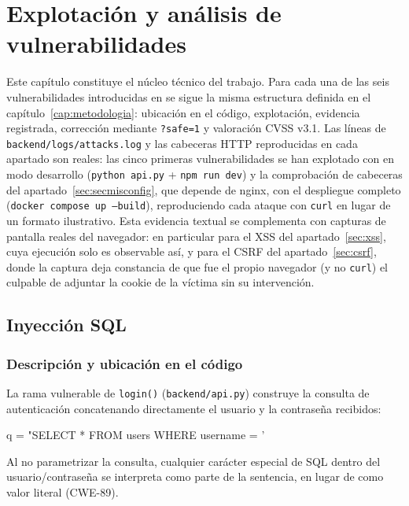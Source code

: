 \chapter{Explotación y análisis de vulnerabilidades}
\label{cap:explotacion}

Este capítulo constituye el núcleo técnico del trabajo. Para cada una de las
seis vulnerabilidades introducidas en \breachlab se sigue la misma
estructura definida en el capítulo~\ref{cap:metodologia}: ubicación en el
código, explotación,
evidencia registrada, corrección mediante \texttt{?safe=1} y valoración
CVSS v3.1. Las líneas de \texttt{backend/logs/attacks.log} y las cabeceras
HTTP reproducidas en cada apartado son reales: las cinco primeras
vulnerabilidades se han explotado con \breachlab en modo desarrollo
(\texttt{python api.py} + \texttt{npm run dev}) y la comprobación de
cabeceras del apartado~\ref{sec:secmisconfig}, que depende de nginx, con el
despliegue completo (\texttt{docker compose up --build}), reproduciendo cada
ataque con \texttt{curl} en lugar de un formato ilustrativo. Esta evidencia
textual se complementa con capturas de pantalla reales del navegador: en particular para
el XSS del apartado~\ref{sec:xss}, cuya ejecución solo es observable así, y
para el CSRF del apartado~\ref{sec:csrf}, donde la captura deja constancia
de que fue el propio navegador (y no \texttt{curl}) el culpable de adjuntar la cookie
de la víctima sin su intervención.

\section{Inyección SQL}
\label{sec:sqli}

\subsection{Descripción y ubicación en el código}

La rama vulnerable de \verb|login()| (\texttt{backend/api.py}) construye la
consulta de autenticación concatenando directamente el usuario y la
contraseña recibidos:

\begin{listing}[language=Python]
q = "SELECT * FROM users WHERE username = '%
\end{listing}

Al no parametrizar la consulta, cualquier carácter especial de SQL dentro
del usuario/contraseña se interpreta como parte de la sentencia, en
lugar de como valor literal (CWE-89).


